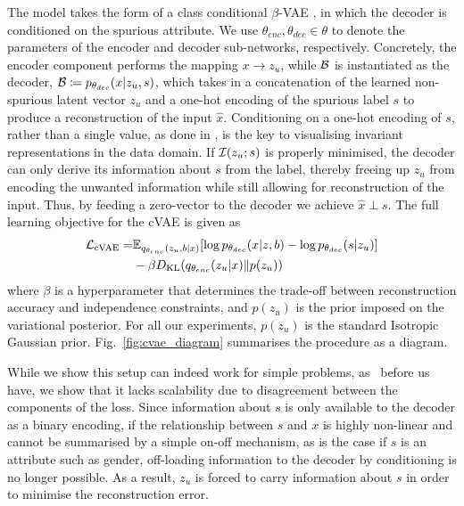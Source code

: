 The model takes the form of a class conditional $\beta$-VAE \citep{higgins2017beta}, in which the
decoder is conditioned on the spurious attribute. 
%
We use $\theta_{enc}, \theta_{dec} \in \theta$ to denote the parameters of the encoder and decoder
sub-networks, respectively. 
%
Concretely, the encoder component performs the mapping $x \to{z_u}$, while ${\mathcal{B}}$ is
instantiated as the decoder, ${\mathcal{B}} \coloneqq p_{\theta_{dec}}(x|z_u, s)$, which takes in a
concatenation of the learned non-spurious latent vector $z_u$ and a one-hot encoding of the
spurious label $s$ to produce a reconstruction of the input $\hat{x}$. 
%
Conditioning on a one-hot encoding of $s$, rather than a single value, as done in
\citet{madras2018learning}, is the key to visualising invariant representations in the data domain.
%
If ${\mathcal{I}}(z_u; s)$ is properly minimised, the decoder can only derive its information about $s$ from
the label, thereby freeing up $z_u$ from encoding the unwanted information while still allowing for
reconstruction of the input.
%
Thus, by feeding a zero-vector to the decoder we achieve $\hat{x} \perp s$. The full learning
objective for the cVAE is given as
%
\begin{align}
\begin{split}
    {\mathcal{L}}_{\mathrm{cVAE}} =& 
    \mathbb{E}_{q_{\theta_{enc}}(z_u, b|x)}[
    \log
    p_{\theta_{dec}}(x|z, b) - \log p_{\theta_{dec}}(s|z_u)
    ] \\ &- \beta D_{\mathrm{KL}}(q_{\theta_{enc}}(z_u |x) \| p(z_u))
\end{split}
\end{align}
%
where $\beta$ is a hyperparameter that determines the trade-off between reconstruction accuracy and
independence constraints, and $p(z_u)$ is the prior imposed on the variational posterior. 
%
For all our experiments, $p(z_u)$ is the standard Isotropic Gaussian prior.
Fig.~\ref{fig:cvae_diagram} summarises the procedure as a diagram.

While we show this setup can indeed work for simple problems, as~\citet{madras2018learning} before
us have, we show that it lacks scalability due to disagreement between the components of the loss.
%
Since information about $s$ is only available to the decoder as a binary encoding, if the
relationship between $s$ and $x$ is highly non-linear and cannot be summarised by a simple on-off
mechanism, as is the case if $s$ is an attribute such as gender, off-loading information to the
decoder by conditioning is no longer possible. 
%
As a result, $z_u$ is forced to carry information about $s$ in order to minimise the
reconstruction error. 

